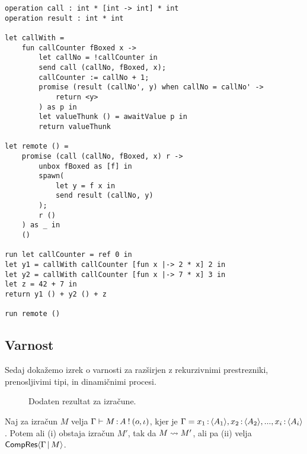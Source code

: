 \begin{lstlisting}[caption={Primer z dinamičnimi procesi},label={prog:razsiritev-3},float,floatplacement=H]
operation call : int * [int -> int] * int
operation result : int * int

let callWith =
	fun callCounter fBoxed x ->
		let callNo = !callCounter in
		send call (callNo, fBoxed, x);
		callCounter := callNo + 1;
		promise (result (callNo', y) when callNo = callNo' ->
			return <y>
		) as p in
		let valueThunk () = awaitValue p in
		return valueThunk

let remote () =
	promise (call (callNo, fBoxed, x) r ->
		unbox fBoxed as [f] in
		spawn(
			let y = f x in
			send result (callNo, y)
		);
		r ()
	) as _ in
	()

run	let callCounter = ref 0 in
let y1 = callWith callCounter [fun x |-> 2 * x] 2 in
let y2 = callWith callCounter [fun x |-> 7 * x] 3 in
let z = 42 + 7 in
return y1 () + y2 () + z

run remote ()
\end{lstlisting}


\subsection{Varnost}

Sedaj dokažemo izrek o varnosti za \lae{} razširjen z rekurzivnimi prestrezniki, prenosljivimi tipi, in dinamičnimi procesi.

\begin{figure}[H]
	\centering
	\begin{mathpar}
	\end{mathpar}
	

	\caption{Dodaten rezultat za izračune.}
	\label{fig:results-rules-2}
\end{figure}



\begin{trditev}[o napredku]\label{trd:gamma-napredek-2}
	Naj za izračun $M$ velja $\Gamma \types M \of \tycomp{A}{\o, \i}$, kjer je $\Gamma = x_1 \of \typromise{A_1}, x_2 \of \typromise{A_2},..., x_i \of \typromise{A_i}$. Potem ali (i) obstaja izračun $M'$, tak da $M \reduces M'$, ali pa (ii) velja $\CompResult{\Gamma}{M}$.
\end{trditev}

